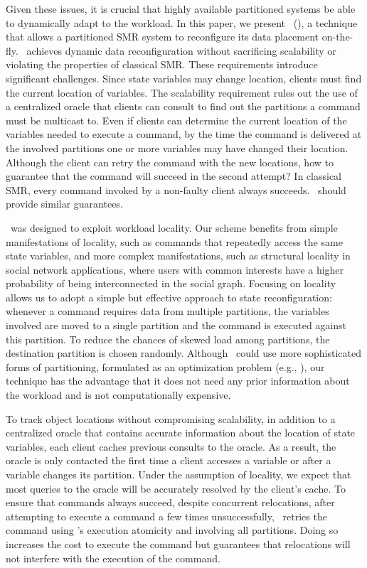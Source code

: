 Given these issues, it is crucial that highly available partitioned systems be able to dynamically adapt to the workload.
In this paper, we present \dssmrlong\ (\dssmr), a technique that allows a partitioned SMR system to reconfigure its data placement on-the-fly.
\dssmr\ achieves dynamic data reconfiguration without sacrificing scalability or violating the properties of classical SMR.
These requirements introduce significant challenges.
Since state variables may change location, clients must find the current location of variables.
The scalability requirement rules out the use of a centralized oracle that clients can consult to find out the partitions a command must be multicast to.
Even if clients can determine the current location of the variables needed to execute a command, by the time the command is delivered at the involved partitions one or more variables may have changed their location.
Although the client can retry the command with the new locations, how to guarantee that the command will succeed in the second attempt?
In classical SMR, every command invoked by a non-faulty client always succeeds.
\dssmr\ should provide similar guarantees.

\dssmr\ was designed to exploit workload locality.
Our scheme benefits from simple manifestations of locality, such as commands that repeatedly access the same state variables, and more complex manifestations, such as structural locality in social network applications, where users with common interests have a higher probability of being interconnected in the social graph.
Focusing on locality allows us to adopt a simple but effective approach to state reconfiguration: whenever a command requires data from multiple partitions, the variables involved are moved to a single partition and the command is executed against this partition.
To reduce the chances of skewed load among partitions, the destination partition is chosen randomly.
Although \dssmr\ could use more sophisticated forms of partitioning, formulated as an optimization problem (e.g., \cite{curino2010sch,taft2014est}), our technique has the advantage that it does not need any prior information about the workload and is not computationally expensive.

To track object locations without compromising scalability, in addition to a centralized oracle that contains accurate information about the location of state variables, each client caches previous consults to the oracle.
As a result, the oracle is only contacted the first time a client accesses a variable or after a variable changes its partition.
Under the assumption of locality, we expect that most queries to the oracle will be accurately resolved by the client's cache.
To ensure that commands always succeed, despite concurrent relocations, after attempting to execute a command a few times unsuccessfully, \dssmr\ retries the command using \ssmr{}'s execution atomicity and involving all partitions. 
Doing so increases the cost to execute the command but guarantees that relocations will not interfere with the execution of the command.

